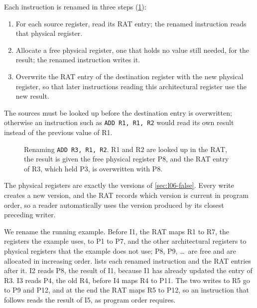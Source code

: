 \documentclass[../main.tex]{subfiles}
\begin{document}
Each instruction is renamed in three steps (\cref{fig:l06-rat}):%
\begin{enumerate}
  \item For each source register, read its RAT entry; the renamed
    instruction reads that physical register.
  \item Allocate a free physical register, one that holds no value still
    needed, for the result; the renamed instruction writes it.
  \item Overwrite the RAT entry of the destination register with the new
    physical register, so that later instructions reading this architectural
    register use the new result.
\end{enumerate}
The sources must be looked up before the destination entry is overwritten;
otherwise an instruction such as \texttt{ADD R1, R1, R2} would read its own
result instead of the previous value of R1.

\begin{figure}[htbp]
  \centering
  
  \caption{Renaming \texttt{ADD R3, R1, R2}.  R1 and R2 are looked up in the
    RAT, the result is given the free physical register P8, and the RAT
    entry of R3, which held P3, is overwritten with P8.}
  \label{fig:l06-rat}
\end{figure}

The physical registers are exactly the versions of \cref{sec:l06-false}.
Every write creates a new version, and the RAT records which version is
current in program order, so a reader automatically uses the version
produced by its closest preceding writer.

\begin{example}
  \label{ex:l06-rename}
  We rename the running example.  Before I1, the RAT maps R1 to R7, the
  registers the example uses, to P1 to P7, and the other architectural
  registers to physical registers that the example does not use; P8, P9, \ldots\ are free and are
  allocated in increasing order.   lists each renamed instruction
  and the RAT entries after it.  I2 reads P8, the result of I1, because I1
  has already updated the entry of R3.  I3 reads P4, the old R4, before I4
  maps R4 to P11.  The two writes to R5 go to P9 and P12, and at the end the
  RAT maps R5 to P12, so an instruction that follows reads the result of I5,
  as program order requires.
\end{example}
\end{document}
